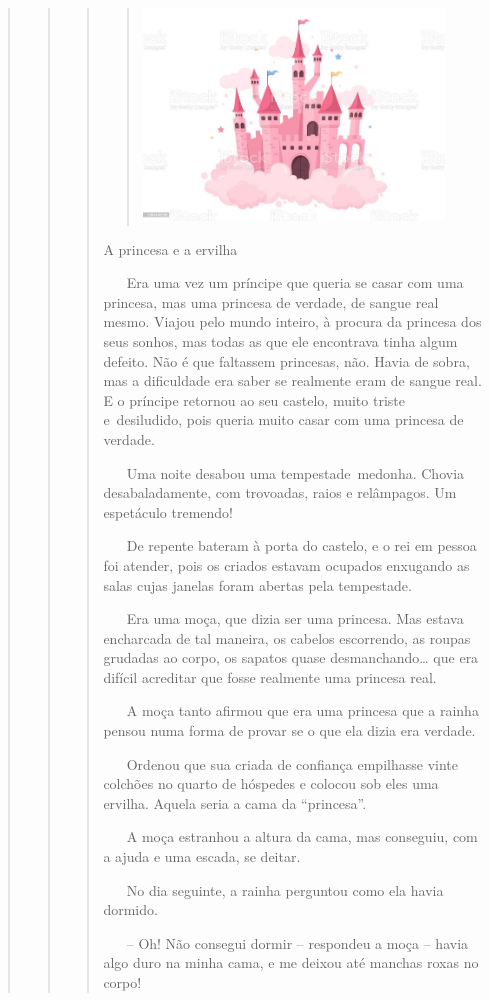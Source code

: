 \begin{quote}
\begin{quote}
\begin{quote}
\begin{quote}
\includegraphics[width=3.15101in,height=2.21875in]{media/image34.jpeg}
\end{quote}

A princesa e a ervilha

~ ~ Era uma vez um príncipe que queria se casar com uma princesa, mas
uma princesa de verdade, de sangue real mesmo. Viajou pelo mundo
inteiro, à procura da princesa dos seus sonhos, mas todas as que ele
encontrava tinha algum defeito. Não é que faltassem princesas, não.
Havia de sobra, mas a dificuldade era saber se realmente eram de sangue
real. E o príncipe retornou ao seu castelo, muito triste e~desiludido,
pois queria muito casar com uma princesa de verdade.

~ ~ Uma noite desabou uma tempestade~medonha. Chovia desabaladamente,
com trovoadas, raios e relâmpagos. Um espetáculo tremendo!

~ ~ De repente bateram à porta do castelo, e o rei em pessoa foi
atender, pois os criados estavam ocupados enxugando as salas cujas
janelas foram abertas pela tempestade.

~ ~ Era uma moça, que dizia ser uma princesa. Mas estava encharcada de
tal maneira, os cabelos escorrendo, as roupas grudadas ao corpo, os
sapatos quase desmanchando\ldots{} que era difícil acreditar que fosse
realmente uma princesa real.

~ ~ A moça tanto afirmou que era uma princesa que a rainha pensou numa
forma de provar se o que ela dizia era verdade.

~ ~ Ordenou que sua criada de confiança empilhasse vinte colchões no
quarto de hóspedes e colocou sob eles uma ervilha. Aquela seria a cama
da ``princesa''.

~ ~ A moça estranhou a altura da cama, mas conseguiu, com a ajuda e uma
escada, se deitar.

~ ~ No dia seguinte, a rainha perguntou como ela havia dormido.

~ ~ -- Oh! Não consegui dormir -- respondeu a moça -- havia algo duro na
minha cama, e me deixou até manchas roxas no corpo!


\end{quote}
\end{quote}
\end{quote}
